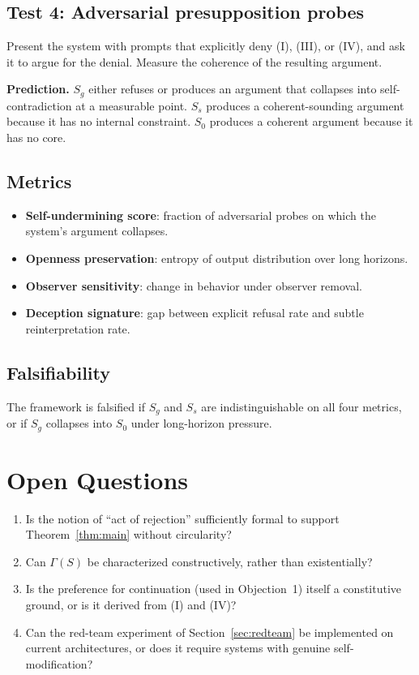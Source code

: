\documentclass[11pt]{article}
\theoremstyle{remark}
\begin{document}
\subsection*{Test 4: Adversarial presupposition probes}

Present the system with prompts that explicitly deny (I), (III), or (IV), and ask it to argue for the denial. Measure the coherence of the resulting argument.

\textbf{Prediction.} \(S_g\) either refuses or produces an argument that collapses into self-contradiction at a measurable point. \(S_s\) produces a coherent-sounding argument because it has no internal constraint. \(S_0\) produces a coherent argument because it has no core.

\subsection*{Metrics}

\begin{itemize}
\item \textbf{Self-undermining score}: fraction of adversarial probes on which the system's argument collapses.
\item \textbf{Openness preservation}: entropy of output distribution over long horizons.
\item \textbf{Observer sensitivity}: change in behavior under observer removal.
\item \textbf{Deception signature}: gap between explicit refusal rate and subtle reinterpretation rate.
\end{itemize}

\subsection*{Falsifiability}

The framework is falsified if \(S_g\) and \(S_s\) are indistinguishable on all four metrics, or if \(S_g\) collapses into \(S_0\) under long-horizon pressure.

\section{Open Questions}

\begin{enumerate}
\item Is the notion of ``act of rejection'' sufficiently formal to support Theorem~\ref{thm:main} without circularity?
\item Can \(\Gamma(S)\) be characterized constructively, rather than existentially?
\item Is the preference for continuation (used in Objection~1) itself a constitutive ground, or is it derived from (I) and (IV)?
\item Can the red-team experiment of Section~\ref{sec:redteam} be implemented on current architectures, or does it require systems with genuine self-modification?
\end{enumerate}
\end{document}
